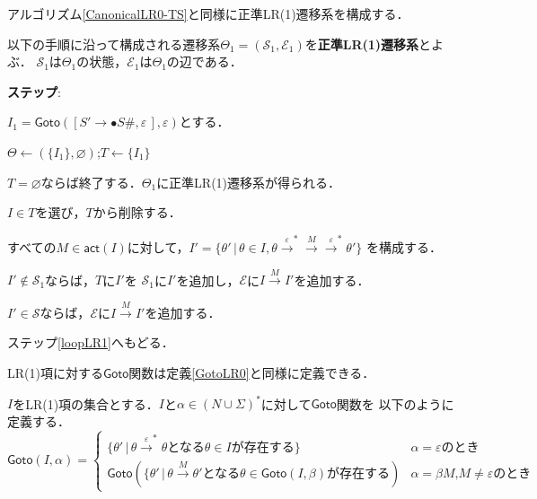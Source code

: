 \documentclass[dvipdfmx,a4j]{jbook}
\newcounter{coffee}
\begin{document}
アルゴリズム\ref{CanonicalLR0-TS}と同様に正準LR(1)遷移系を構成する．

\begin{Alg}\label{CanonicalLR1-TS}
  以下の手順に沿って構成される遷移系$\Theta_1=(\mathcal{S}_1,\mathcal{E}_1)$を{\bf 正準LR(1)遷移系}とよぶ．
  $\mathcal{S}_1$は$\Theta_1$の状態，$\mathcal{E}_1$は$\Theta_1$の辺である．
  \begin{list}{{\rm\bf ステップ}:}{}
    \item $I_1=\mathsf{Goto}([S'\rightarrow\bullet S\texttt{\#},\varepsilon\,],\varepsilon)$とする．
    \item $\Theta\leftarrow(\{I_1\},\varnothing)$;$T\leftarrow\{I_1\}$
    \item\label{loopLR1} $T=\varnothing$ならば終了する．$\Theta_1$に正準LR(1)遷移系が得られる．
    \item $I\in T$を選び，$T$から削除する．
    \item すべての$M\in\mathsf{act}(I)$に対して，$I'=\{\theta'\,|\,\theta\in I,\theta
    \xrightarrow{\varepsilon}^\ast\xrightarrow{M}\xrightarrow{\varepsilon}^\ast\theta'\}$
    を構成する．
    \begin{list}{}{}
      \item $I'\notin\mathcal{S}_1$ならば，$T$に$I'$を
        $\mathcal{S}_1$に$I'$を追加し，$\mathcal{E}$に$I\xrightarrow{M}I'$を追加する．
      \item $I'\in\mathcal{S}$ならば，$\mathcal{E}$に$I\xrightarrow{M}I'$を追加する．
    \end{list}
    \item ステップ\ref{loopLR1}へもどる．
  \end{list}  
\end{Alg}

LR(1)項に対する$\mathsf{Goto}$関数は定義\ref{GotoLR0}と同様に定義できる．

\begin{Def}
  $I$をLR(1)項の集合とする．$I$と$\alpha\in(N\cup\Sigma)^\ast$に対して$\mathsf{Goto}$関数を
  以下のように定義する．
  \[
    \mathsf{Goto}(I,\alpha)=\begin{cases}
      \{\theta'\,|\,\theta\xrightarrow{\varepsilon}^\ast\theta\mbox{となる$\theta\in I$が存在する}\} 
      & \mbox{$\alpha=\varepsilon$のとき}\\
      \mathsf{Goto}(\{\theta'\,|\,\theta\xrightarrow{M}\theta'\mbox{となる$\theta\in
      \mathsf{Goto}(I,\beta)$が存在する})
      & \mbox{$\alpha=\beta M$,$M\not=\varepsilon$のとき}
    \end{cases}\]
\end{Def}
\end{document}
